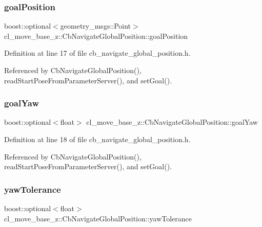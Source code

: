 \subsubsection{\texorpdfstring{goal\+Position}{goalPosition}}
{\footnotesize\ttfamily boost\+::optional$<$geometry\+\_\+msgs\+::\+Point$>$ cl\+\_\+move\+\_\+base\+\_\+z\+::\+Cb\+Navigate\+Global\+Position\+::goal\+Position}



Definition at line 17 of file cb\+\_\+navigate\+\_\+global\+\_\+position.\+h.



Referenced by Cb\+Navigate\+Global\+Position(), read\+Start\+Pose\+From\+Parameter\+Server(), and set\+Goal().

\mbox{\label{classcl__move__base__z_1_1CbNavigateGlobalPosition_a839900de7f664b27c9be189fadbaa003}} 
\subsubsection{\texorpdfstring{goal\+Yaw}{goalYaw}}
{\footnotesize\ttfamily boost\+::optional$<$float$>$ cl\+\_\+move\+\_\+base\+\_\+z\+::\+Cb\+Navigate\+Global\+Position\+::goal\+Yaw}



Definition at line 18 of file cb\+\_\+navigate\+\_\+global\+\_\+position.\+h.



Referenced by Cb\+Navigate\+Global\+Position(), read\+Start\+Pose\+From\+Parameter\+Server(), and set\+Goal().

\mbox{\label{classcl__move__base__z_1_1CbNavigateGlobalPosition_af7c005e386a5062091618384534cd2b9}} 
\subsubsection{\texorpdfstring{yaw\+Tolerance}{yawTolerance}}
{\footnotesize\ttfamily boost\+::optional$<$float$>$ cl\+\_\+move\+\_\+base\+\_\+z\+::\+Cb\+Navigate\+Global\+Position\+::yaw\+Tolerance}



